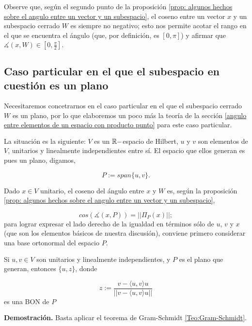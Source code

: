 \QEDB
\vspace{0.2cm}

\begin{nota}
Observe que, según el segundo punto de la proposición 
\ref{prop: algunos hechos sobre el angulo entre un vector y un subespacio}, 
el coseno entre un vector $x$ y un subespacio cerrado $W$ es
siempre no negativo; esto nos permite acotar el rango en el que
se encuentra el ángulo (que, por definición, es $[0, \pi]$)
y afirmar que $\measuredangle(x, W) \in [0, \frac{\pi}{2}]$.
\end{nota}

\subsection{Caso particular en el que el subespacio en cuestión es un plano}
\label{ap: Caso particular en el que el subespacio en cuestión es un plano}

Necesitaremos concetrarnos en el caso
particular en el que el subespacio cerrado $W$ es 
un plano, por lo que elaboremos un poco más
la teoría de la sección 
\ref{angulo entre elementos de un espacio con producto punto}
para este caso particular.

La situación es la siguiente: $V$ es un $\mathbb{R}-$espacio
de Hilbert, $u$ y $v$ son elementos de $V$,
unitarios y linealmente
independientes entre sí. El espacio que ellos generan
es pues un plano, digamos,


\[
P := span \{ u, v \}.
\]

Dado $x \in V$ unitario, 
el coseno del ángulo entre $x$ y $W$ es,
según la proposición
\ref{prop: algunos hechos sobre el angulo entre un vector y un subespacio},

\begin{equation}
\label{eq0: 19Marzo}
cos \left( \measuredangle (x, P) \right) = || \Pi_{P}(x) ||;
\end{equation}
para lograr expresar el lado derecho de la igualdad en términos
sólo de $u$, $v$ y $x$ (que son los elementos básicos de
nuestra discusión), conviene primero considerar una base
ortonormal del espacio $P$.


\begin{obs}
Si $u, v \in V$ son unitarios y linealmente independientes, y $P$
es el plano que generan, entonces
$\{ u, z \}$, donde

\begin{equation}
\label{eq2: 19Marzo}
z:= \frac{v- \langle u, v \rangle u}{||v- \langle u, v \rangle u||}
\end{equation}
es una BON de $P$
\end{obs}
\noindent
\textbf{Demostración.}
Basta aplicar el teorema de Gram-Schmidt 
\ref{Teo:Gram-Schmidt}.
\QEDB
\vspace{0.2cm}

